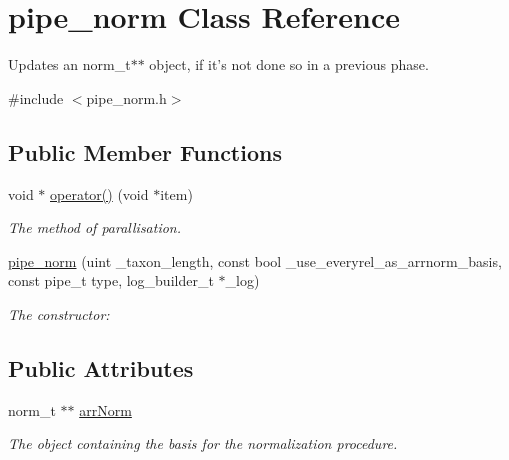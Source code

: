 \hypertarget{classpipe__norm}{
\section{pipe\_\-norm Class Reference}
\label{classpipe__norm}
}


Updates an norm\_\-t$\ast$$\ast$ object, if it's not done so in a previous phase.  




{\ttfamily \#include $<$pipe\_\-norm.h$>$}

\subsection*{Public Member Functions}
\begin{DoxyCompactItemize}
\item 
\hypertarget{classpipe__norm_a89ae98064a7fc6400c20dfea00557ae8}{
void $\ast$ \hyperlink{classpipe__norm_a89ae98064a7fc6400c20dfea00557ae8}{operator()} (void $\ast$item)}
\label{classpipe__norm_a89ae98064a7fc6400c20dfea00557ae8}

\begin{DoxyCompactList}\small\item\em The method of parallisation. \end{DoxyCompactList}\item 
\hypertarget{classpipe__norm_a4df63999e295062e47a3fd54d375a6de}{
\hyperlink{classpipe__norm_a4df63999e295062e47a3fd54d375a6de}{pipe\_\-norm} (uint \_\-taxon\_\-length, const bool \_\-use\_\-everyrel\_\-as\_\-arrnorm\_\-basis, const pipe\_\-t type, log\_\-builder\_\-t $\ast$\_\-log)}
\label{classpipe__norm_a4df63999e295062e47a3fd54d375a6de}

\begin{DoxyCompactList}\small\item\em The constructor: \end{DoxyCompactList}\end{DoxyCompactItemize}
\subsection*{Public Attributes}
\begin{DoxyCompactItemize}
\item 
\hypertarget{classpipe__norm_a53c135b038a3efcc42a27ac8010d9976}{
norm\_\-t $\ast$$\ast$ \hyperlink{classpipe__norm_a53c135b038a3efcc42a27ac8010d9976}{arrNorm}}
\label{classpipe__norm_a53c135b038a3efcc42a27ac8010d9976}

\begin{DoxyCompactList}\small\item\em The object containing the basis for the normalization procedure. \end{DoxyCompactList}\end{DoxyCompactItemize}



